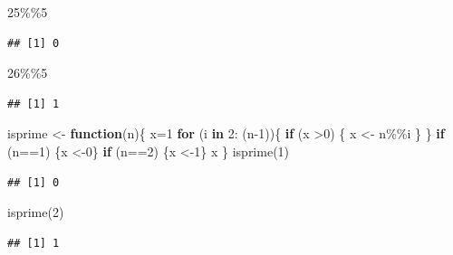 \documentclass[
]{article}
\newenvironment{Shaded}{\begin{snugshade}}{\end{snugshade}}
\newcommand{\ControlFlowTok}[1]{\textcolor[rgb]{0.13,0.29,0.53}{\textbf{#1}}}
\newcommand{\DecValTok}[1]{\textcolor[rgb]{0.00,0.00,0.81}{#1}}
\newcommand{\FunctionTok}[1]{\textcolor[rgb]{0.00,0.00,0.00}{#1}}
\newcommand{\NormalTok}[1]{#1}
\newcommand{\OtherTok}[1]{\textcolor[rgb]{0.56,0.35,0.01}{#1}}
\newcommand{\SpecialCharTok}[1]{\textcolor[rgb]{0.00,0.00,0.00}{#1}}
\theoremstyle{definition}
\theoremstyle{definition}
\theoremstyle{definition}
\theoremstyle{remark}
\begin{document}
\begin{Shaded}
\begin{Highlighting}[]
\DecValTok{25}\SpecialCharTok{\%\%}\DecValTok{5}
\end{Highlighting}
\end{Shaded}

\begin{verbatim}
## [1] 0
\end{verbatim}

\begin{Shaded}
\begin{Highlighting}[]
\DecValTok{26}\SpecialCharTok{\%\%}\DecValTok{5}
\end{Highlighting}
\end{Shaded}

\begin{verbatim}
## [1] 1
\end{verbatim}

\begin{Shaded}
\begin{Highlighting}[]
\NormalTok{isprime }\OtherTok{\textless{}{-}} \ControlFlowTok{function}\NormalTok{(n)\{}
\NormalTok{x}\OtherTok{=}\DecValTok{1}
\ControlFlowTok{for}\NormalTok{ (i }\ControlFlowTok{in} \DecValTok{2}\SpecialCharTok{:}\NormalTok{ (n}\DecValTok{{-}1}\NormalTok{))\{}
\ControlFlowTok{if}\NormalTok{ (x }\SpecialCharTok{\textgreater{}}\DecValTok{0}\NormalTok{) \{}
\NormalTok{x }\OtherTok{\textless{}{-}}\NormalTok{ n}\SpecialCharTok{\%\%}\NormalTok{i}
\NormalTok{\}}
\NormalTok{\}}
\ControlFlowTok{if}\NormalTok{ (n}\SpecialCharTok{==}\DecValTok{1}\NormalTok{) \{x }\OtherTok{\textless{}{-}}\DecValTok{0}\NormalTok{\}}
\ControlFlowTok{if}\NormalTok{ (n}\SpecialCharTok{==}\DecValTok{2}\NormalTok{) \{x }\OtherTok{\textless{}{-}}\DecValTok{1}\NormalTok{\}}
\NormalTok{ x}
\NormalTok{ \}}
 \FunctionTok{isprime}\NormalTok{(}\DecValTok{1}\NormalTok{)}
\end{Highlighting}
\end{Shaded}

\begin{verbatim}
## [1] 0
\end{verbatim}

\begin{Shaded}
\begin{Highlighting}[]
 \FunctionTok{isprime}\NormalTok{(}\DecValTok{2}\NormalTok{)}
\end{Highlighting}
\end{Shaded}

\begin{verbatim}
## [1] 1
\end{verbatim}
\end{document}
